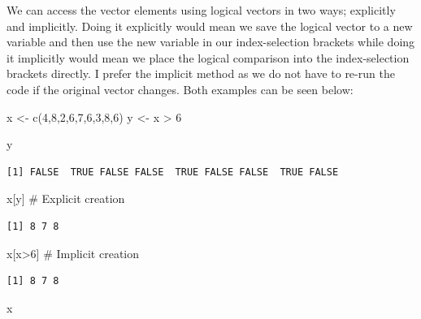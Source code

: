 \documentclass[
  letterpaper,
  DIV=11,
  numbers=noendperiod]{scrreprt}
\newenvironment{Shaded}{\begin{snugshade}}{\end{snugshade}}
\newcommand{\CommentTok}[1]{\textcolor[rgb]{0.37,0.37,0.37}{#1}}
\newcommand{\DecValTok}[1]{\textcolor[rgb]{0.68,0.00,0.00}{#1}}
\newcommand{\FunctionTok}[1]{\textcolor[rgb]{0.28,0.35,0.67}{#1}}
\newcommand{\NormalTok}[1]{\textcolor[rgb]{0.00,0.23,0.31}{#1}}
\newcommand{\OtherTok}[1]{\textcolor[rgb]{0.00,0.23,0.31}{#1}}
\newcommand{\SpecialCharTok}[1]{\textcolor[rgb]{0.37,0.37,0.37}{#1}}
\begin{document}
We can access the vector elements using logical vectors in two ways;
explicitly and implicitly. Doing it explicitly would mean we save the
logical vector to a new variable and then use the new variable in our
index-selection brackets while doing it implicitly would mean we place
the logical comparison into the index-selection brackets directly. I
prefer the implicit method as we do not have to re-run the code if the
original vector changes. Both examples can be seen below:

\begin{Shaded}
\begin{Highlighting}[]
\NormalTok{x }\OtherTok{\textless{}{-}} \FunctionTok{c}\NormalTok{(}\DecValTok{4}\NormalTok{,}\DecValTok{8}\NormalTok{,}\DecValTok{2}\NormalTok{,}\DecValTok{6}\NormalTok{,}\DecValTok{7}\NormalTok{,}\DecValTok{6}\NormalTok{,}\DecValTok{3}\NormalTok{,}\DecValTok{8}\NormalTok{,}\DecValTok{6}\NormalTok{)}
\NormalTok{y }\OtherTok{\textless{}{-}}\NormalTok{ x }\SpecialCharTok{\textgreater{}} \DecValTok{6}

\NormalTok{y}
\end{Highlighting}
\end{Shaded}

\begin{verbatim}
[1] FALSE  TRUE FALSE FALSE  TRUE FALSE FALSE  TRUE FALSE
\end{verbatim}

\begin{Shaded}
\begin{Highlighting}[]
\NormalTok{x[y] }\CommentTok{\# Explicit creation}
\end{Highlighting}
\end{Shaded}

\begin{verbatim}
[1] 8 7 8
\end{verbatim}

\begin{Shaded}
\begin{Highlighting}[]
\NormalTok{x[x}\SpecialCharTok{\textgreater{}}\DecValTok{6}\NormalTok{] }\CommentTok{\# Implicit creation}
\end{Highlighting}
\end{Shaded}

\begin{verbatim}
[1] 8 7 8
\end{verbatim}

\begin{Shaded}
\begin{Highlighting}[]
\NormalTok{x}
\end{Highlighting}
\end{Shaded}
\end{document}
